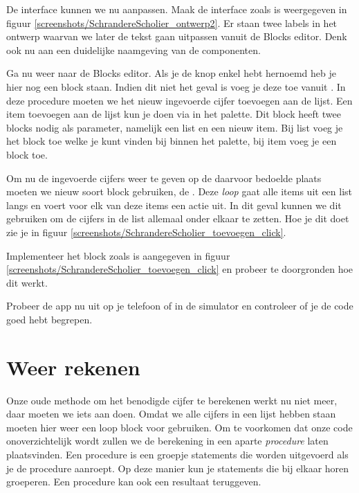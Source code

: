  \begin{opgave}
    \opgVraag
De interface kunnen we nu aanpassen. Maak de interface zoals is weergegeven in figuur \ref{screenshots/SchrandereScholier_ontwerp2}. Er staan twee labels in het ontwerp waarvan we later de tekst gaan uitpassen vanuit de Blocks editor. Denk ook nu aan een duidelijke naamgeving van de componenten.
\end{opgave}

Ga nu weer naar de Blocks editor. Als je de knop enkel hebt hernoemd heb je hier nog een block  staan. Indien dit niet het geval is voeg je deze toe vanuit . In deze procedure moeten we het nieuw ingevoerde cijfer toevoegen aan de lijst. Een item toevoegen aan de lijst kun je doen via  in het  palette. Dit block heeft twee blocks nodig als parameter, namelijk een list en een nieuw item. Bij list voeg je het  block toe welke je kunt vinden bij  binnen het  palette, bij item voeg je een block  toe. 

Om nu de ingevoerde cijfers weer te geven op de daarvoor bedoelde plaats moeten we nieuw soort block gebruiken, de . Deze \emph{loop} gaat alle items uit een list langs en voert voor elk van deze items een actie uit. In dit geval kunnen we dit gebruiken om de cijfers in de list allemaal onder elkaar te zetten. Hoe je dit doet zie je in figuur \ref{screenshots/SchrandereScholier_toevoegen_click}.

 \begin{opgave}
    \opgVraag
Implementeer het  block zoals is aangegeven in figuur \ref{screenshots/SchrandereScholier_toevoegen_click} en probeer te doorgronden hoe dit werkt.
\end{opgave}

\runOpTelefoon{} Probeer de app nu uit op je telefoon of in de simulator en controleer of je de code goed hebt begrepen.

\section{Weer rekenen}
Onze oude methode om het benodigde cijfer te berekenen werkt nu niet meer, daar moeten we iets aan doen. Omdat we alle cijfers in een lijst hebben staan moeten hier weer een loop block voor gebruiken. Om te voorkomen dat onze code onoverzichtelijk wordt zullen we de berekening in een aparte \emph{procedure} laten plaatsvinden. Een procedure is een groepje statements die worden uitgevoerd als je de procedure aanroept. Op deze manier kun je statements die bij elkaar horen groeperen. Een procedure kan ook een resultaat teruggeven.

